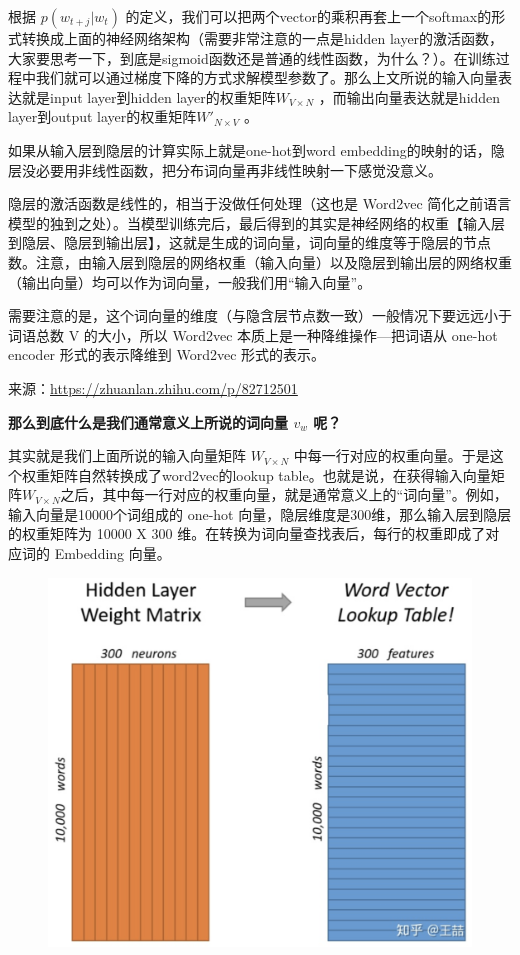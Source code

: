 \documentclass[12pt]{article}
\begin{document}
根据 $p(w_{t+j}|w_t)$ 的定义，我们可以把两个vector的乘积再套上一个softmax的形式转换成上面的神经网络架构（需要非常注意的一点是hidden layer的激活函数，大家要思考一下，到底是sigmoid函数还是普通的线性函数，为什么？）。在训练过程中我们就可以通过梯度下降的方式求解模型参数了。那么上文所说的输入向量表达就是input layer到hidden layer的权重矩阵$W_{V\times N}$ ，而输出向量表达就是hidden layer到output layer的权重矩阵$W'_{N\times V}$ 。
\begin{framed}
如果从输入层到隐层的计算实际上就是one-hot到word embedding的映射的话，隐层没必要用非线性函数，把分布词向量再非线性映射一下感觉没意义。

隐层的激活函数是线性的，相当于没做任何处理（这也是 Word2vec 简化之前语言模型的独到之处）。当模型训练完后，最后得到的其实是神经网络的权重【输入层到隐层、隐层到输出层】，这就是生成的词向量，词向量的维度等于隐层的节点数。注意，由输入层到隐层的网络权重（输入向量）以及隐层到输出层的网络权重（输出向量）均可以作为词向量，一般我们用“输入向量”。

需要注意的是，这个词向量的维度（与隐含层节点数一致）一般情况下要远远小于词语总数 V 的大小，所以 Word2vec 本质上是一种降维操作—把词语从 one-hot encoder 形式的表示降维到 Word2vec 形式的表示。

来源：\url{https://zhuanlan.zhihu.com/p/82712501}
\end{framed}

\textbf{那么到底什么是我们通常意义上所说的词向量 $v_w$ 呢？}

其实就是我们上面所说的输入向量矩阵 $W_{V\times N}$ 中每一行对应的权重向量。于是这个权重矩阵自然转换成了word2vec的lookup table。也就是说，在获得输入向量矩阵$W_{V\times N}$之后，其中每一行对应的权重向量，就是通常意义上的“词向量”。例如，输入向量是10000个词组成的 one-hot 向量，隐层维度是300维，那么输入层到隐层的权重矩阵为 10000 X 300 维。在转换为词向量查找表后，每行的权重即成了对应词的 Embedding 向量。
\begin{figure}[H]
    \centering
    \includegraphics[width=.6\textwidth]{fig/Word2Vec_Lookup_Table.png}
\end{figure}
\end{document}
